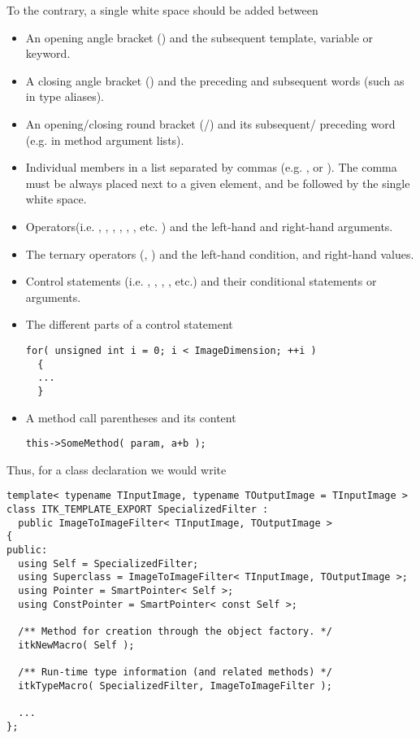To the contrary, a single white space should be added between
\begin{itemize}
\item An opening angle bracket (\code{<}) and the subsequent template,
variable or keyword.
\item A closing angle bracket (\code{>}) and the preceding and subsequent
words (such as in type aliases).
\item An opening/closing round bracket (\code{(}/\code{)}) and its subsequent/
preceding word (e.g. in method argument lists).
\item Individual members in a list separated by commas (e.g.
, or ). The comma must be
always placed next to a given element, and be followed by the single white space.
\item Operators(i.e. \code{+}, \code{-}, \code{=}, \code{==}, \code{+=},
\code{<<}, etc. ) and the left-hand and right-hand arguments.
\item The ternary operators (, \code{:}) and the left-hand condition,
and right-hand values.
\item Control statements (i.e. , , ,
, etc.) and their conditional statements or arguments.
\item The different parts of a  control statement

\small
\begin{verbatim}
for( unsigned int i = 0; i < ImageDimension; ++i )
  {
  ...
  }
\end{verbatim}
\normalsize

\item A method call parentheses and its content

\small
\begin{verbatim}
this->SomeMethod( param, a+b );
\end{verbatim}
\normalsize

\end{itemize}

Thus, for a class declaration we would write

\small
\begin{verbatim}
template< typename TInputImage, typename TOutputImage = TInputImage >
class ITK_TEMPLATE_EXPORT SpecializedFilter :
  public ImageToImageFilter< TInputImage, TOutputImage >
{
public:
  using Self = SpecializedFilter;
  using Superclass = ImageToImageFilter< TInputImage, TOutputImage >;
  using Pointer = SmartPointer< Self >;
  using ConstPointer = SmartPointer< const Self >;

  /** Method for creation through the object factory. */
  itkNewMacro( Self );

  /** Run-time type information (and related methods) */
  itkTypeMacro( SpecializedFilter, ImageToImageFilter );

  ...
};
\end{verbatim}
\normalsize


